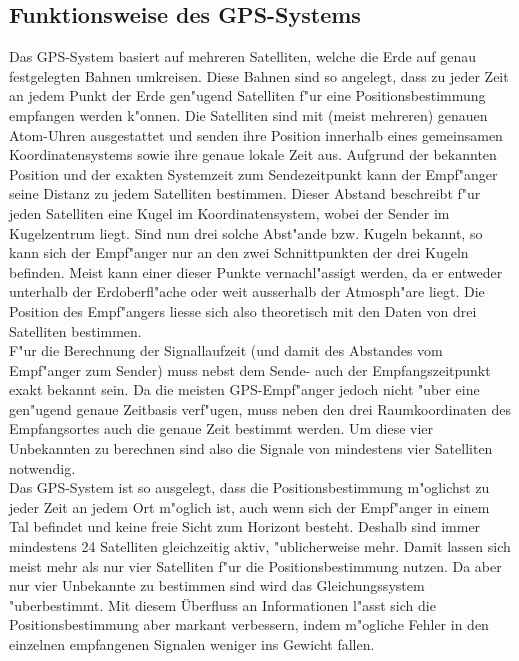 	\subsection{Funktionsweise des GPS-Systems}
		Das GPS-System basiert auf mehreren Satelliten, welche die Erde auf genau festgelegten Bahnen umkreisen. Diese Bahnen sind so angelegt, dass zu jeder Zeit an jedem Punkt der Erde gen"ugend Satelliten f"ur eine Positionsbestimmung empfangen werden k"onnen. Die Satelliten sind mit (meist mehreren) genauen Atom-Uhren ausgestattet und senden ihre Position innerhalb eines gemeinsamen Koordinatensystems sowie ihre genaue lokale Zeit aus. Aufgrund der bekannten Position und der exakten Systemzeit zum Sendezeitpunkt kann der Empf"anger seine Distanz zu jedem Satelliten bestimmen. Dieser Abstand beschreibt f"ur jeden Satelliten eine Kugel im Koordinatensystem, wobei der Sender im Kugelzentrum liegt. Sind nun drei solche Abst"ande bzw. Kugeln bekannt, so kann sich der Empf"anger nur an den zwei Schnittpunkten der drei Kugeln befinden. Meist kann einer dieser Punkte vernachl"assigt werden, da er entweder unterhalb der Erdoberfl"ache oder weit ausserhalb der Atmosph"are liegt. Die Position des Empf"angers liesse sich also theoretisch mit den Daten von drei Satelliten bestimmen. \\[0.2cm]
		F"ur die Berechnung der Signallaufzeit (und damit des Abstandes vom Empf"anger zum Sender) muss nebst dem Sende- auch der Empfangszeitpunkt exakt bekannt sein. Da die meisten GPS-Empf"anger jedoch nicht "uber eine gen"ugend genaue Zeitbasis verf"ugen, muss neben den drei Raumkoordinaten des Empfangsortes auch die genaue Zeit bestimmt werden. Um diese vier Unbekannten zu berechnen sind also die Signale von mindestens vier Satelliten notwendig. \\[0.2cm]
		Das GPS-System ist so ausgelegt, dass die Positionsbestimmung m"oglichst zu jeder Zeit an jedem Ort m"oglich ist, auch wenn sich der Empf"anger in einem Tal befindet und keine freie Sicht zum Horizont besteht. Deshalb sind immer mindestens 24 Satelliten gleichzeitig aktiv, "ublicherweise mehr. Damit lassen sich meist mehr als nur vier Satelliten f"ur die Positionsbestimmung nutzen. Da aber nur vier Unbekannte zu bestimmen sind wird das Gleichungssystem "uberbestimmt. Mit diesem Überfluss an Informationen l"asst sich die Positionsbestimmung aber markant verbessern, indem m"ogliche Fehler in den einzelnen empfangenen Signalen weniger ins Gewicht fallen. 

